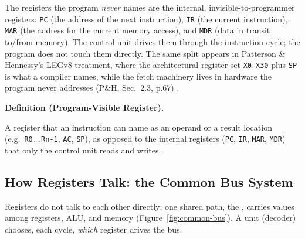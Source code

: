 \documentclass[11pt]{article}
\newenvironment{definitionbox}[1]{%
  \par\noindent\textbf{Definition (#1).}\ \itshape
}{\par\vspace{0.3em}}
\begin{document}
The registers the program \emph{never} names are the internal, invisible-to-programmer registers: \texttt{PC} (the address of the next instruction), \texttt{IR} (the current instruction), \texttt{MAR} (the address for the current memory access), and \texttt{MDR} (data in transit to/from memory). The control unit drives them through the instruction cycle; the program does not touch them directly. The same split appears in Patterson \& Hennessy's LEGv8 treatment, where the architectural register set \texttt{X0}--\texttt{X30} plus \texttt{SP} is what a compiler names, while the fetch machinery lives in hardware the program never addresses (P\&H, Sec.~2.3, p.67) \cite{PattersonHennessy2017_computer_organization_design}.

\begin{definitionbox}{Program-Visible Register}
A register that an instruction can name as an operand or a result location (e.g.\ \texttt{R0..Rn-1}, \texttt{AC}, \texttt{SP}), as opposed to the internal registers (\texttt{PC}, \texttt{IR}, \texttt{MAR}, \texttt{MDR}) that only the control unit reads and writes.
\end{definitionbox}

\subsection{How Registers Talk: the Common Bus System}

Registers do not talk to each other directly; one shared path, the , carries values among registers, ALU, and memory (Figure~\ref{fig:common-bus}). A  unit (decoder) chooses, each cycle, \emph{which} register drives the bus.
\end{document}

